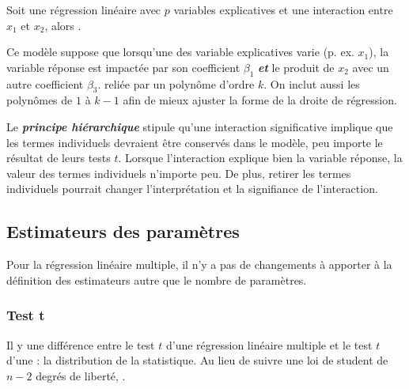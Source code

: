\documentclass[french]{article}
\begin{document}
\begin{multicols*}{2}
\begin{definitionNOHFILLsub}
Soit une régression linéaire avec $p$ variables explicatives et une interaction entre $x_{1}$ et $x_{2}$, alors . 

\bigskip

Ce modèle suppose que lorsqu'une des variable explicatives varie (p. ex. $x_{1}$), la variable réponse est impactée par son coefficient $\beta_{1}$ \textbf{\textit{et}} le produit de $x_{2}$ avec un autre coefficient $\beta_{3}$. reliée par un polynôme d'ordre $k$. On inclut aussi les polynômes de $1$ à $k - 1$ afin de mieux ajuster la forme de la droite de régression.
\end{definitionNOHFILLsub}


\begin{definitionNOHFILL}
Le \textbf{\textit{principe hiérarchique}} stipule qu'une interaction significative implique que les termes individuels devraient être conservés dans le modèle, peu importe le résultat de leurs tests $t$. Lorsque l'interaction explique bien la variable réponse, la valeur des termes individuels n'importe peu. De plus, retirer les termes individuels pourrait changer l'interprétation et la signifiance de l'interaction. 
\end{definitionNOHFILL}



\columnbreak
\subsection{Estimateurs des paramètres}
\begin{rappel_enhanced}[Contexte]
Pour la régression linéaire multiple, il n'y a pas de changements à apporter à la définition des estimateurs autre que le nombre de paramètres.
\end{rappel_enhanced}

\subsubsection{Test t}
\begin{rappel_enhanced}[Contexte]
Il y une différence entre le test $t$ d'une régression linéaire multiple et le test $t$ d'une \textit{\underline{}} : la distribution de la statistique. Au lieu de suivre une loi de student de $n - 2$ degrés de liberté, .


\end{rappel_enhanced}
\end{multicols*}
\end{document}
